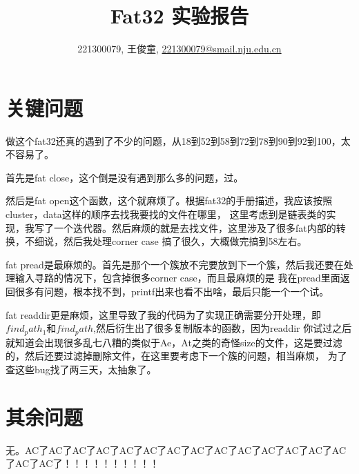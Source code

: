 \documentclass[a4paper,UTF8]{article}
\numberwithin{equation}{section}
\theoremstyle{definition}
\begin{document}
\title{Fat32 实验报告}
\author{221300079, 王俊童, \href{mailto:221300079@smail.nju.edu.cn}{221300079@smail.nju.edu.cn}}
\maketitle
    \section{关键问题}

    做这个fat32还真的遇到了不少的问题，从18到52到58到72到78到90到92到100，太不容易了。

    首先是fat close，这个倒是没有遇到那么多的问题，过。

    然后是fat open这个函数，这个就麻烦了。根据fat32的手册描述，我应该按照cluster，data这样的顺序去找我要找的文件在哪里，
    这里考虑到是链表类的实现，我写了一个迭代器。然后麻烦的就是去找文件，这里涉及了很多fat内部的转换，不细说，然后我处理corner case
    搞了很久，大概做完搞到58左右。

    fat pread是最麻烦的。首先是那个一个簇放不完要放到下一个簇，然后我还要在处理输入寻路的情况下，包含掉很多corner case，而且最麻烦的是
    我在pread里面返回很多有问题，根本找不到，printf出来也看不出啥，最后只能一个一个试。

    fat readdir更是麻烦，这里导致了我的代码为了实现正确需要分开处理，即$find_path_1$和$find_path$,然后衍生出了很多复制版本的函数，因为readdir
    你试过之后就知道会出现很多乱七八糟的类似于Ae，At之类的奇怪size的文件，这是要过滤的，然后还要过滤掉删除文件，在这里要考虑下一个簇的问题，相当麻烦，
    为了查这些bug找了两三天，太抽象了。
    
    \section{其余问题}

    无。AC了AC了AC了AC了AC了AC了AC了AC了AC了AC了AC了AC了AC了AC了AC了AC了！！！！！！！！！！
\end{document}

